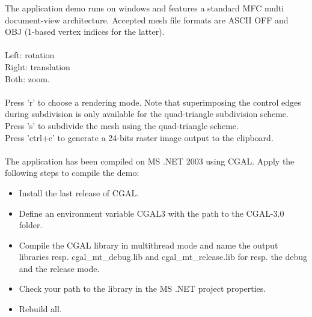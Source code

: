 The application demo runs on windows and features a standard MFC multi
document-view architecture. Accepted mesh file formats are ASCII OFF
and OBJ (1-based vertex indices for the latter). \\

\\
Left: rotation\\
Right: translation\\
Both: zoom.\\

\\
Press 'r' to choose a rendering mode. Note that superimposing the
control edges during subdivision is only available for the
quad-triangle subdivision scheme.\\
Press 's' to subdivide the mesh using the quad-triangle scheme.\\
Press 'ctrl+c' to generate a 24-bits raster image output to the clipboard.\\

\\
The application has been compiled on MS .NET 2003 using CGAL. Apply
the following steps to compile the demo:
\begin{itemize}
\item Install the last release of CGAL.
\item Define an environment variable CGAL3 with the path to the CGAL-3.0 folder.
\item Compile the CGAL library in multithread mode and name the output 
      libraries resp. cgal\_mt\_debug.lib and cgal\_mt\_release.lib 
      for resp. the debug and the release mode.
\item Check your path to the library in the MS .NET project
      properties.
\item Rebuild all.
\end{itemize}

